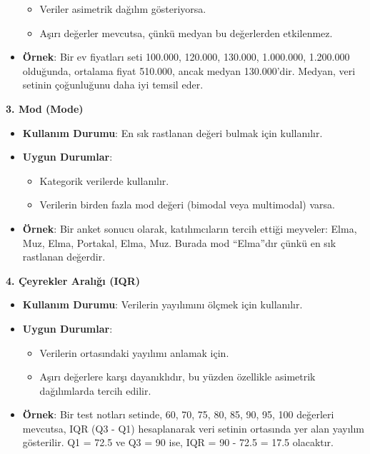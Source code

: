 \documentclass[
  letterpaper,
  DIV=11,
  numbers=noendperiod]{scrartcl}
\begin{document}
\begin{tcolorbox}
\begin{itemize}
  \begin{itemize}
  \item
    Veriler asimetrik dağılım gösteriyorsa.
  \item
    Aşırı değerler mevcutsa, çünkü medyan bu değerlerden etkilenmez.
  \end{itemize}
\item
  \textbf{Örnek}: Bir ev fiyatları seti 100.000, 120.000, 130.000,
  1.000.000, 1.200.000 olduğunda, ortalama fiyat 510.000, ancak medyan
  130.000'dir. Medyan, veri setinin çoğunluğunu daha iyi temsil eder.
\end{itemize}

\textbf{3. Mod (Mode)}

\begin{itemize}
\item
  \textbf{Kullanım Durumu}: En sık rastlanan değeri bulmak için
  kullanılır.
\item
  \textbf{Uygun Durumlar}:

  \begin{itemize}
  \item
    Kategorik verilerde kullanılır.
  \item
    Verilerin birden fazla mod değeri (bimodal veya multimodal) varsa.
  \end{itemize}
\item
  \textbf{Örnek}: Bir anket sonucu olarak, katılımcıların tercih ettiği
  meyveler: Elma, Muz, Elma, Portakal, Elma, Muz. Burada mod ``Elma''dır
  çünkü en sık rastlanan değerdir.
\end{itemize}

\textbf{4. Çeyrekler Aralığı (IQR)}

\begin{itemize}
\item
  \textbf{Kullanım Durumu}: Verilerin yayılımını ölçmek için kullanılır.
\item
  \textbf{Uygun Durumlar}:

  \begin{itemize}
  \item
    Verilerin ortasındaki yayılımı anlamak için.
  \item
    Aşırı değerlere karşı dayanıklıdır, bu yüzden özellikle asimetrik
    dağılımlarda tercih edilir.
  \end{itemize}
\item
  \textbf{Örnek}: Bir test notları setinde, 60, 70, 75, 80, 85, 90, 95,
  100 değerleri mevcutsa, IQR (Q3 - Q1) hesaplanarak veri setinin
  ortasında yer alan yayılım gösterilir. Q1 = 72.5 ve Q3 = 90 ise, IQR =
  90 - 72.5 = 17.5 olacaktır.
\end{itemize}


\end{tcolorbox}
\end{document}
